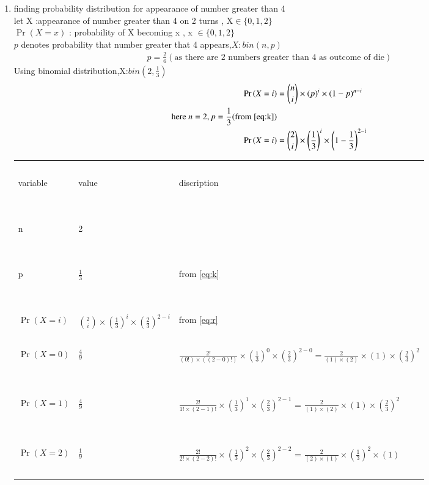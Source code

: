 \documentclass[journal,12pt,onecolumn]{IEEEtran}
\providecommand{\pr}[1]{\ensuremath{\Pr\left(#1\right)}}
\providecommand{\brak}[1]{\ensuremath{\left(#1\right)}}
\theoremstyle{remark}
\begin{document}
\begin{enumerate}
\item finding probability distribution for appearance of number greater than 4\\
let X :appearance of number greater than 4 on 2 turns , X$\in \{0,1,2\}$\\
$\pr{X=x}$ : probability of X becoming x , x $\in \{ 0,1,2 \}$\\
$p$ denotes probability that number greater that 4 appears,$X:bin(n,p)$ 
\begin{align}
p=\frac{2}{6}(\text{as there are 2 numbers greater than  4 as outcome of die})\label{eq:k} 
\end{align}
Using binomial distribution,X:$bin(2,\frac{1}{3})$
\begin{align}
\pr{X=i}&={n \choose i}\times(p)^i\times(1-p)^{n-i}\\
\text{here } n=2,p=\frac{1}{3}  (\text{from } \eqref{eq:k})\\
\pr{X=i}&={2 \choose i}\times \brak{\frac{1}{3}}^i\times\brak{1-\frac{1}{3}}^{2-i} \label{eq:r}
\end{align}
\begin{tabular}{|l|l|l|}
\hline
\ &\ &\ \\
\large variable & \large value & \large discription\\
\ & \ & \ \\
\hline
\ &\ &\  \\
\large {n} & \large{2} & \\
\ & \ & \   \\
\hline
\ & \ & \   \\
\large {p} & \large$\frac{1}{3}$ & from \eqref{eq:k}\\
\ & \ & \   \\
\hline
\ & \ & \   \\
\large {$\pr{X=i}$} & \large${2 \choose i}\times \brak{\frac{1}{3}}^i\times\brak{\frac{2}{3}}^{2-i}$ & from \eqref{eq:r}\\
\hline
\ & \ & \ \\
$\pr{X=0}$  &\Large $\frac{4}{9}$ & \large $\frac{2!}{(0!)\times((2-0)!)}\times\brak{\frac{1}{3}}^0\times\brak{\frac{2}{3}}^{2-0}
 = $\large$ \frac{2}{(1)\times(2)}\times(1)\times\brak{\frac{2}{3}}^{2} $\\
 \ & \ & \ \\
 \hline
 \ & \ & \ \\
$\pr{X=1}$ & \Large$\frac{4}{9}$ & \large $\frac{2!}{1!\times(2-1)!}\times\brak{\frac{1}{3}}^{1}\times\brak{\frac{2}{3}}^{2-1}$
= \large $\frac{2}{(1)\times(2)}\times(1)\times\brak{\frac{2}{3}}^{2}$ \\
\ & \ & \ \\
\hline
\ & \ & \ \\
$\pr{X=2}$  & \Large $\frac{1}{9}$ & \large $\frac{2!}{2!\times(2-2)!}\times\brak{\frac{1}{3}}^{2}\times\brak{\frac{2}{3}}^{2-2}$ 
= \large $\frac{2}{(2)\times(1)}\times\brak{\frac{1}{3}}^{2}\times(1)$\\
\ & \ & \ \\
\hline
\end{tabular}
\vspace{2mm}


\end{enumerate}
\end{document}
